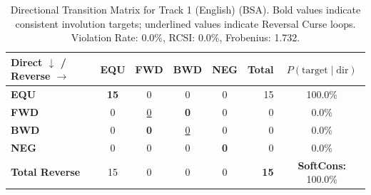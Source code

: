\begin{table}[ht]
\centering
\small
\begin{tabular}{l|cccc|r|c}
\toprule
\textbf{Direct $\downarrow$ / Reverse $\rightarrow$} & \textbf{EQU} & \textbf{FWD} & \textbf{BWD} & \textbf{NEG} & \textbf{Total} & \textbf{$P(\text{target} \mid \text{dir})$} \\
\midrule
\textbf{EQU} & \textbf{15} & 0 & 0 & 0 & 15 & 100.0\% \\
\textbf{FWD} & 0 & \underline{0} & \textbf{0} & 0 & 0 & 0.0\% \\
\textbf{BWD} & 0 & \textbf{0} & \underline{0} & 0 & 0 & 0.0\% \\
\textbf{NEG} & 0 & 0 & 0 & \textbf{0} & 0 & 0.0\% \\
\midrule
\textbf{Total Reverse} & 15 & 0 & 0 & 0 & \textbf{15} & \textbf{SoftCons:} 100.0\% \\
\bottomrule
\end{tabular}
\caption{Directional Transition Matrix for Track 1 (English) (BSA). Bold values indicate consistent involution targets; underlined values indicate Reversal Curse loops. Violation Rate: 0.0\%, RCSI: 0.0\%, Frobenius: 1.732.}
\label{tab:transition_matrix}
\end{table}